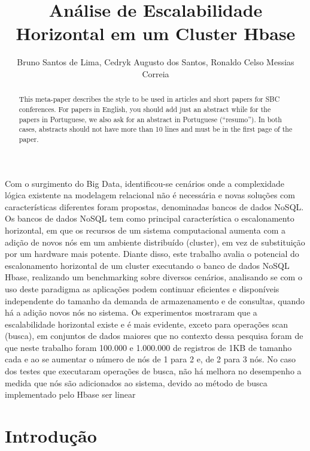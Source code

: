 \documentclass[12pt]{article}
\title{Análise de Escalabilidade Horizontal em um Cluster Hbase}
\author{Bruno Santos de Lima, Cedryk Augusto dos Santos, Ronaldo Celso Messias Correia }
\begin{document}
 

\maketitle


\begin{abstract}
  This meta-paper describes the style to be used in articles and short papers
  for SBC conferences. For papers in English, you should add just an abstract
  while for the papers in Portuguese, we also ask for an abstract in
  Portuguese (``resumo''). In both cases, abstracts should not have more than
  10 lines and must be in the first page of the paper.
\end{abstract}
     
\begin{resumo} 
Com o surgimento do Big Data, identificou-se cenários onde a complexidade lógica existente na modelagem relacional não é necessária e novas soluções com características diferentes foram propostas, denominadas bancos de dados NoSQL. Os bancos de dados NoSQL tem como principal característica o escalonamento horizontal, em que os recursos de um sistema computacional aumenta com a adição de novos nós em um ambiente distribuído (cluster), em vez de substituição por um hardware mais potente. Diante disso, este trabalho avalia o potencial do escalonamento horizontal de um cluster executando o banco de dados NoSQL Hbase, realizando um benchmarking sobre diversos cenários, analisando se com o uso deste paradigma as aplicações podem continuar eficientes e disponíveis independente do tamanho da demanda de armazenamento e de consultas, quando há a adição novos nós no sistema. Os experimentos mostraram que a escalabilidade horizontal existe e é mais evidente, exceto para operações scan (busca), em conjuntos de dados maiores que no contexto dessa pesquisa foram de que neste trabalho foram 100.000 e 1.000.000 de registros de 1KB de tamanho cada e ao se aumentar o número de nós de 1 para 2 e, de 2 para 3 nós. No caso dos testes que executaram operações de busca, não há melhora no desempenho a medida que nós são adicionados ao sistema, devido ao método de busca implementado pelo Hbase ser linear
\end{resumo}


\section{Introdução}
\label{sec:introducao}
\end{document}
